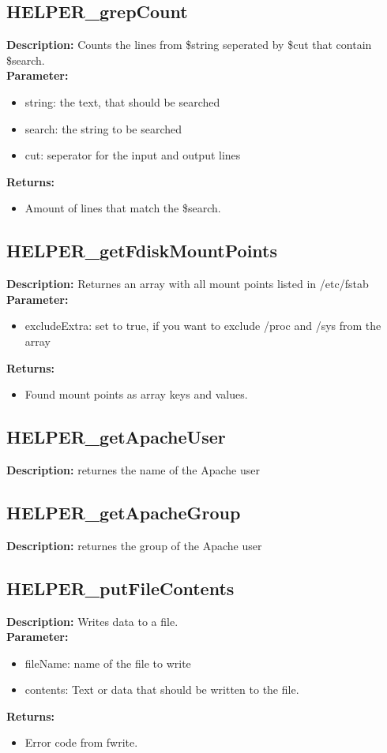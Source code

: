 \subsection{HELPER\_grepCount}
\textbf{Description:} Counts the lines from \$string seperated by \$cut that contain \$search.\\
\textbf{Parameter:}
\begin{itemize}
\item string: the text, that should be searched
\item search: the string to be searched
\item cut: seperator for the input and output lines
\end{itemize}
\textbf{Returns:}
\begin{itemize}
\item Amount of lines that match the \$search.
\end{itemize}

\subsection{HELPER\_getFdiskMountPoints}
\textbf{Description:} Returnes an array with all mount points listed in /etc/fstab\\
\textbf{Parameter:}
\begin{itemize}
\item excludeExtra: set to true, if you want to exclude /proc and /sys from the array
\end{itemize}
\textbf{Returns:}
\begin{itemize}
\item Found mount points as array keys and values.
\end{itemize}

\subsection{HELPER\_getApacheUser}
\textbf{Description:} returnes the name of the Apache user\\

\subsection{HELPER\_getApacheGroup}
\textbf{Description:} returnes the group of the Apache user\\

\subsection{HELPER\_putFileContents}
\textbf{Description:} Writes data to a file.\\
\textbf{Parameter:}
\begin{itemize}
\item fileName: name of the file to write
\item contents: Text or data that should be written to the file.
\end{itemize}
\textbf{Returns:}
\begin{itemize}
\item Error code from fwrite.
\end{itemize}


